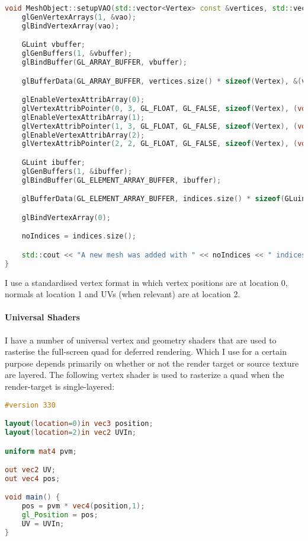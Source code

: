 \begin{lstlisting}[caption={MeshObject.cpp},language=c++]
void MeshObject::setupVAO(std::vector<Vertex> const &vertices, std::vector<GLuint> const &indices) {
    glGenVertexArrays(1, &vao);
    glBindVertexArray(vao);

    GLuint vbuffer;
    glGenBuffers(1, &vbuffer);
    glBindBuffer(GL_ARRAY_BUFFER, vbuffer);

    glBufferData(GL_ARRAY_BUFFER, vertices.size() * sizeof(Vertex), &(vertices[0]), GL_STATIC_DRAW);

    glEnableVertexAttribArray(0);
    glVertexAttribPointer(0, 3, GL_FLOAT, GL_FALSE, sizeof(Vertex), (void*)offsetof(Vertex, position));
    glEnableVertexAttribArray(1);
    glVertexAttribPointer(1, 3, GL_FLOAT, GL_FALSE, sizeof(Vertex), (void*)offsetof(Vertex, normal));
    glEnableVertexAttribArray(2);
    glVertexAttribPointer(2, 2, GL_FLOAT, GL_FALSE, sizeof(Vertex), (void*)offsetof(Vertex, UV));

    GLuint ibuffer;
    glGenBuffers(1, &ibuffer);
    glBindBuffer(GL_ELEMENT_ARRAY_BUFFER, ibuffer);

    glBufferData(GL_ELEMENT_ARRAY_BUFFER, indices.size() * sizeof(GLuint), &(indices[0]), GL_STATIC_DRAW);

    glBindVertexArray(0);

    noIndices = indices.size();

    std::cout << "A new mesh was added with " << noIndices << " indices" << std::endl;
}
\end{lstlisting}

I use a standardised vertex format in which vertex positions are at location 0, normals at location 1 and UVs (when relevant) are at location 2.

\paragraph{Universal Shaders}
I have a number of universal vertex and geometry shaders that are used to rasterise the full-screen quad for deferred rendering. Which I use for a certain purpose depends primarily on whether or not the render target or source texture are layered. The following vertex shader is used to rasterize a quad when the render-target is single-layered:
\begin{lstlisting}[caption={unlayered\_texture.vert},language=GLSL]
#version 330

layout(location=0)in vec3 position;
layout(location=2)in vec2 UVIn;

uniform mat4 pvm;

out vec2 UV;
out vec4 pos;

void main() {
    pos = pvm * vec4(position,1);
    gl_Position = pos;
    UV = UVIn;
}
\end{lstlisting}

